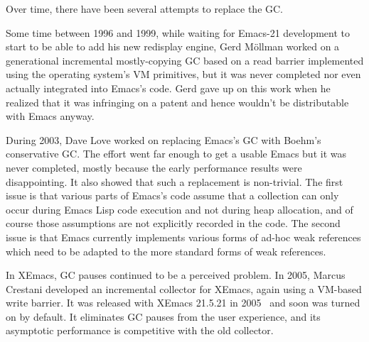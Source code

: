 \documentclass[format=acmsmall, review]{acmart}
\newcommand \Elisp {Emacs Lisp}
\begin{document}
Over time, there have been several attempts to replace the GC.

Some time between 1996 and 1999, while waiting for Emacs-21 development to
start to be able to add his new redisplay engine, Gerd
Möllman worked on a generational incremental mostly-copying GC based on
a read barrier implemented using the operating system's VM primitives, but
it was never completed nor even actually integrated into Emacs's code.
Gerd gave up on this work when he realized that it was infringing on
a patent and hence wouldn't be distributable with Emacs anyway.

During 2003, Dave Love worked on replacing Emacs's GC with Boehm's
conservative GC.  The effort went far enough to get a usable Emacs but it
was never completed, mostly because the early performance results were
disappointing.  It also showed that such a replacement is non-trivial.
The first issue is that various parts of Emacs's code assume that
a collection can only occur during \Elisp{} code execution and not during
heap allocation, and of course those assumptions are not explicitly recorded
in the code.  The second issue is that Emacs currently implements various
forms of ad-hoc weak references which need to be adapted to the more
standard forms of weak references.

\label{sec:incremental-gc}
In XEmacs, GC pauses continued to be a perceived problem.  In 2005, Marcus
Crestani developed an incremental collector for XEmacs, again using
a VM-based write barrier.  It was released with XEmacs 21.5.21 in
2005~\cite{Crestani2005} and soon was turned on by default.  It
eliminates GC pauses from the user experience, and its asymptotic
performance is competitive with the old collector.
\end{document}
